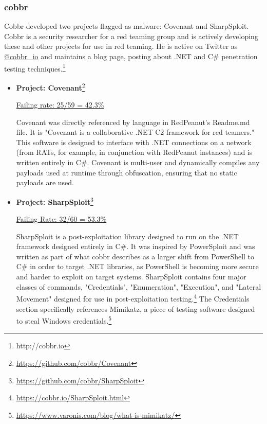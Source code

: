 \documentclass[]{acmart}
\begin{document}
\subsubsection{cobbr}
Cobbr developed two projects flagged as malware: Covenant and SharpSploit. Cobbr is a security researcher for a red teaming group and is actively developing these and other projects for use in red teaming. He is active on Twitter as \href{https://twitter.com/cobbr_io}{@cobbr\_io} and maintains a blog page, posting about .NET and C\# penetration testing techniques.\footnote{http://cobbr.io} 
\begin{itemize}
    \item { \bf Project: Covenant}\footnote{\url{https://github.com/cobbr/Covenant}}
    
    \underline{ Failing rate: 25/59 = 42.3\% }

    Covenant was directly referenced by language in RedPeanut's Readme.md file. It is "Covenant is a collaborative .NET C2 framework for red teamers." This software is designed to interface with .NET connections on a network (from RATs, for example, in conjunction with RedPeanut instances) and is written entirely in C\#. Covenant is multi-user and dynamically compiles any payloads used at runtime through obfuscation, ensuring that no static payloads are used.

    \item{ \bf Project: SharpSploit}\footnote{\url{https://github.com/cobbr/SharpSploit}}
    
    \underline{ Failing Rate: 32/60 = 53.3\% }
    
    SharpSploit is a post-exploitation library designed to run on the .NET framework designed entirely in C\#. It was inspired by PowerSploit and was written as part of what cobbr describes as a larger shift from PowerShell to C\# in order to target .NET libraries, as PowerShell is becoming more secure and harder to exploit on target systems. SharpSploit contains four major classes of commands, "Credentials", "Enumeration", "Execution", and "Lateral Movement" designed for use in post-exploitation testing.\footnote{\url{https://cobbr.io/SharpSploit.html}} The Credentials section specifically references Mimikatz, a piece of testing software designed to steal Windows credentials.\footnote{\url{https://www.varonis.com/blog/what-is-mimikatz/}}
\end{itemize}
\end{document}
